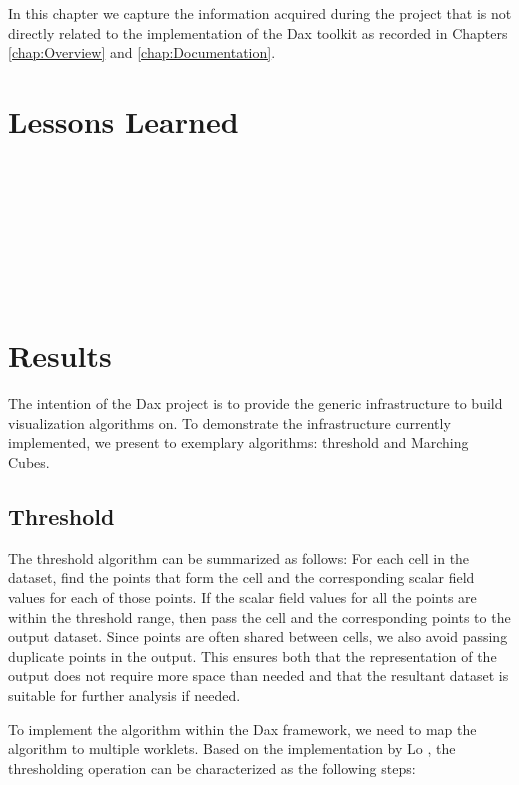 
In this chapter we capture the information acquired during the project that
is not directly related to the implementation of the Dax toolkit as
recorded in Chapters \ref{chap:Overview} and \ref{chap:Documentation}.

\section{Lessons Learned}

\noindent
{} \\
 \\
 \\
 \\
 \\
 \\
 \\

\section{Results}

The intention of the Dax project is to provide the generic infrastructure
to build visualization algorithms on. To demonstrate the infrastructure
currently implemented, we present to exemplary algorithms: threshold and
Marching Cubes.

\subsection{Threshold}

The threshold algorithm can be summarized as follows: For each cell in the
dataset, find the points that form the cell and the corresponding scalar
field values for each of those points. If the scalar field values for all
the points are within the threshold range, then pass the cell and the
corresponding points to the output dataset. Since points are often shared
between cells, we also avoid passing duplicate points in the output. This
ensures both that the representation of the output does not require more
space than needed and that the resultant dataset is suitable for further
analysis if needed.

To implement the algorithm within the Dax framework, we need to map the
algorithm to multiple worklets. Based on the implementation by Lo
\etal{}, the thresholding operation can be characterized as the
following steps:

